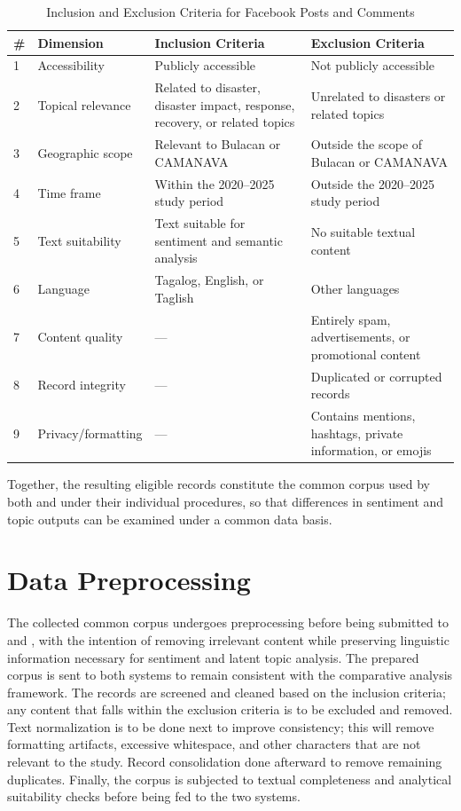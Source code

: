 \begin{table}[htbp]
	\centering
	\caption{Inclusion and Exclusion Criteria for Facebook Posts and Comments}
	\label{tab:screening_criteria}
	\begin{tabular}{p{0.5cm} p{3.2cm} p{5.2cm} p{5.2cm}}
		\toprule
		\textbf{\#} & \textbf{Dimension} & \textbf{Inclusion Criteria} & \textbf{Exclusion Criteria} \\
		\midrule
		1 & Accessibility      & Publicly accessible & Not publicly accessible \\
		2 & Topical relevance  & Related to disaster, disaster impact, response, recovery, or related topics & Unrelated to disasters or related topics \\
		3 & Geographic scope   & Relevant to Bulacan or CAMANAVA & Outside the scope of Bulacan or CAMANAVA \\
		4 & Time frame         & Within the 2020--2025 study period & Outside the 2020--2025 study period \\
		5 & Text suitability   & Text suitable for sentiment and semantic analysis & No suitable textual content \\
		6 & Language           & Tagalog, English, or Taglish & Other languages \\
		7 & Content quality    & --- & Entirely spam, advertisements, or promotional content \\
		8 & Record integrity   & --- & Duplicated or corrupted records \\
		9 & Privacy/formatting & --- & Contains mentions, hashtags, private information, or emojis \\
		\bottomrule
	\end{tabular}
\end{table}

Together, the resulting eligible records constitute the common corpus used by
both \sysA{} and \sysB{} under their individual procedures, so that differences
in sentiment and topic outputs can be examined under a common data basis.

\section*{Data Preprocessing}

The collected common corpus undergoes preprocessing before being submitted
to \sysA{} and \sysB, with the intention of removing irrelevant content while
preserving linguistic information necessary for sentiment and latent topic
analysis. The prepared corpus is sent to both systems to remain
consistent with the comparative analysis framework. The records are screened and cleaned based on the inclusion criteria; any content that falls
within the exclusion criteria is to be excluded and removed. Text normalization
is to be done next to improve consistency; this will remove formatting
artifacts, excessive whitespace, and other characters that are not relevant to
the study. Record consolidation done afterward to remove remaining
duplicates. Finally, the corpus is subjected to textual completeness and
analytical suitability checks before being fed to the two systems.

